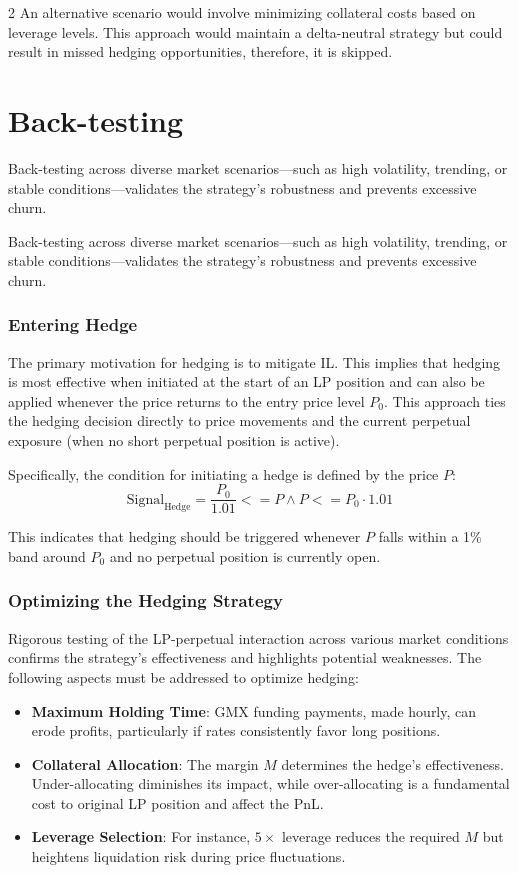\documentclass[10pt]{article}
\begin{document}
\begin{multicols}{2}
\medskip
An alternative scenario would involve minimizing collateral costs based on leverage levels. This approach would maintain a delta-neutral strategy but could result in missed hedging opportunities, therefore, it is skipped.

\newpage

\section{Back-testing}

Back-testing across diverse market scenarios—such as high volatility, trending, or stable conditions—validates the strategy’s robustness and prevents excessive churn.

Back-testing across diverse market scenarios—such as high volatility, trending, or stable conditions—validates the strategy’s robustness and prevents excessive churn.


\subsubsection{Entering Hedge}

The primary motivation for hedging is to mitigate IL. This implies that hedging is most effective when initiated at the start of an LP position and can also be applied whenever the price returns to the entry price level $P_0$. This approach ties the hedging decision directly to price movements and the current perpetual exposure (when no short perpetual position is active).

\medskip

Specifically, the condition for initiating a hedge is defined by the price $P$:
$$\text{Signal}_\text{Hedge} = \frac{P_0}{1.01} <= P \wedge P <= P_0 \cdot 1.01$$ 

This indicates that hedging should be triggered whenever $P$ falls within a 1\% band around $P_0$ and no perpetual position is currently open.

\subsubsection{Optimizing the Hedging Strategy}
Rigorous testing of the LP-perpetual interaction across various market conditions confirms the strategy’s effectiveness and highlights potential weaknesses. The following aspects must be addressed to optimize hedging:

\begin{itemize}
	\item \textbf{Maximum Holding Time}: GMX funding payments, made hourly, can erode profits, particularly if rates consistently favor long positions.
	\item \textbf{Collateral Allocation}: The margin $M$ determines the hedge’s effectiveness. Under-allocating diminishes its impact, while over-allocating is a fundamental cost to original LP position and affect the PnL.
	\item \textbf{Leverage Selection}: For instance, $5\times$ leverage reduces the required $M$ but heightens liquidation risk during price fluctuations.
\end{itemize}


\end{multicols}
\end{document}

